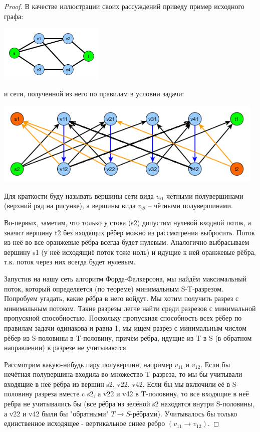 \documentclass[a4paper,12pt]{article}
\theoremstyle{remark}
\begin{document}
\begin{proof}
	В качестве иллюстрации своих рассуждений приведу пример исходного графа:
	
	\includegraphics[width=5cm]{flow-problem-step-12-fig1.png}
	
	и сети, полученной из него по правилам в условии задачи:
	
	\includegraphics[width=13cm]{flow-problem-step-12-fig2.png}
	
	Для краткости буду называть вершины сети вида $v_{i1}$ чётными полувершинами (верхний ряд на рисунке), а вершины вида $v_{i2}$ -- чётными полувершинами.
	
	Во-первых, заметим, что только у стока (s2) допустим нулевой входной поток, а значит вершину t2 без входящих рёбер можно из рассмотрения выбросить. Поток из неё во все оранжевые рёбра всегда будет нулевым. Аналогично выбрасываем вершину s1 (у неё исходящиё поток тоже ноль) и идущие к ней оранжевые рёбра, т.к. поток через них всегда будет нулевым.
	
	Запустив на нашу сеть алгоритм Форда-Фалкерсона, мы найдём максимальный поток, который определяется (по теореме) минимальным S-T-разрезом. Попробуем угадать, какие рёбра в него войдут. Мы хотим получить разрез с минимальным потоком. Такие разрезы легче найти среди разрезов с минимальной пропускной способностью. Поскольку пропускная способность всех рёбер по правилам задачи одинакова и равна 1, мы ищем разрез с минимальным числом рёбер из S-половины в T-половину, причём рёбра, идущие из T в S (в обратном направлении) в разрезе не учитываются.
	
	Рассмотрим какую-нибудь пару полувершин, например $v_{11}$ и $v_{12}$. Если бы нечётная полувершина входила во множество T разреза, то мы бы учитывали входящие в неё рёбра из вершин s2, v22, v42. Если бы мы включили её в S-половину разреза вместе c s2, а v22 и v42 в T-половину, то все входящие в неё ребра не учитывались бы (все рёбра из зелёной s2 находятся внутри S-половины, а v22 и v42 были бы "обратными" $T \rightarrow S$-рёбрами). Учитывалось бы только единственное исходящее - вертикальное синее ребро $(v_{11} \rightarrow v_{12})$.
	

\end{proof}
\end{document}

